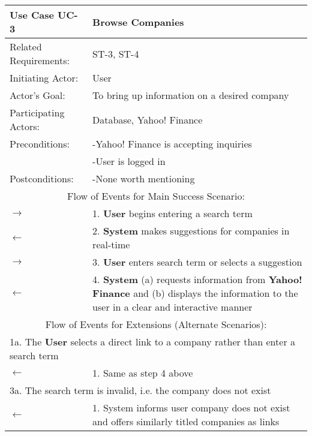 \begin{centering}
\renewcommand\arraystretch{1.3} %
\label{UC-3}
\begin{longtable}{|p{1.2in} p{5in}|}
\hline

\bfseries{\color{color1}Use Case UC-3} & \bfseries{\color{color1}Browse Companies} \\
\hline
Related Requirements: & ST-3, ST-4 \\ 
Initiating Actor:     & User \\
Actor's Goal:         & To bring up information on a desired company \\
Participating Actors:  & Database, Yahoo! Finance \\
Preconditions:        & -Yahoo! Finance is accepting inquiries \\
 & -User is logged in \\
Postconditions:       & -None worth mentioning \\
\hline
\multicolumn{2}{|c|}{\color{color1}Flow of Events for Main Success Scenario:}\\
\hline
$\rightarrow$ & 1. \textbf{User} begins entering a search term \\
$\leftarrow$ & 2. \textbf{System} makes suggestions for companies in real-time \\
$\rightarrow$ & 3. \textbf{User} enters search term or selects a suggestion \\
$\leftarrow$ & 4. \textbf{System} (a) requests information from \textbf{Yahoo! Finance} and (b) displays the information to the user in a clear and interactive manner \\
\hline
\multicolumn{2}{|c|}{\color{color1}Flow of Events for Extensions (Alternate Scenarios):} \\
\hline
\multicolumn{2}{|p{6.2in}|}{1a. The \textbf{User} selects a direct link to a company rather than enter a search term} \\
\hline
$\leftarrow$ & 1.  Same as step 4 above \\
\hline 
\multicolumn{2}{|p{6.2in}|}{3a. The search term is invalid, i.e. the company does not exist} \\
\hline
$\leftarrow$ & 1.  System informs user company does not exist and offers similarly titled companies as links \\
\hline
\end{longtable}
\end{centering}

